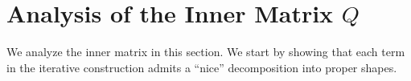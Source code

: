 \documentclass[12pt]{article}
\def \E {\mathbb{E}}
\def \al {\alpha}
\def\1{\bm{1}}
\newcommand{\gam}{\gamma}
\newcommand{\cm}{\mathsf{M} }
\newcommand{\fp}{\mathsf{P}}
\newcommand{\todo}[1]{\textcolor{red}{(#1)}}
\newcommand{\q}{\mathfrak q}
\begin{document}
%	  
%	 
%   	
%	 
%	 





%
\section{Analysis of the Inner Matrix \texorpdfstring{$Q$}{Q}} \label{sec:inner-matrix-Q}
We analyze the inner matrix in this section.  We start by showing that each term in the iterative construction admits a ``nice'' decomposition into proper shapes.
\end{document}
